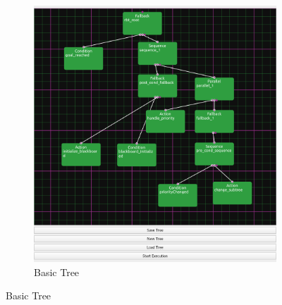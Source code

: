 \documentclass[report]{iisthesis}
\begin{document}
\begin{figure}[htp]
    \centering
    \begin{subfigure}[b]{.45\linewidth}
    \includegraphics[width=\linewidth]{basicTree.png}
    \caption{Basic Tree}
    \end{subfigure}


\end{figure}
\end{document}

